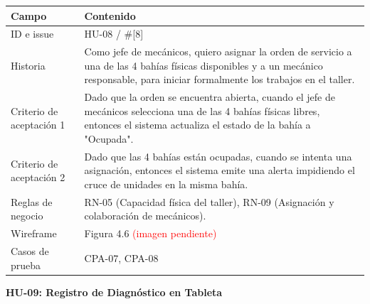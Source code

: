 {\def\LTcaptype{none} %
\begin{longtable}[]{@{}
  >{\raggedright\arraybackslash}p{}
  >{\raggedright\arraybackslash}p{}@{}}
\toprule\noalign{}
\begin{minipage}[b]{\linewidth}\raggedright
\textbf{Campo}
\end{minipage} & \begin{minipage}[b]{\linewidth}\raggedright
\textbf{Contenido}
\end{minipage} \\
\midrule\noalign{}
\endhead
\bottomrule\noalign{}
\endlastfoot
ID e issue & HU-08 / \#{[}8{]} \\
Historia & Como jefe de mecánicos, quiero asignar la orden de servicio a
una de las 4 bahías físicas disponibles y a un mecánico responsable,
para iniciar formalmente los trabajos en el taller. \\
Criterio de aceptación 1 & Dado que la orden se encuentra abierta,
cuando el jefe de mecánicos selecciona una de las 4 bahías físicas
libres, entonces el sistema actualiza el estado de la bahía a
"Ocupada". \\
Criterio de aceptación 2 & Dado que las 4 bahías están ocupadas, cuando
se intenta una asignación, entonces el sistema emite una alerta
impidiendo el cruce de unidades en la misma bahía. \\
Reglas de negocio & RN-05 (Capacidad física del taller), RN-09
(Asignación y colaboración de mecánicos). \\
Wireframe & Figura 4.6 \textcolor{red}{(imagen pendiente)} \\
Casos de prueba & CPA-07, CPA-08 \\
\end{longtable}
}

\textbf{HU-09: Registro de Diagnóstico en Tableta}

